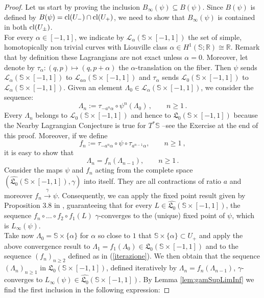 \documentclass{article}
\newcommand{\1}{\mathbbm{1}}
\theoremstyle{remark}
\begin{document}
\begin{proof}
Let us start by proving the inclusion $B_{\infty}(\psi) \subseteq B(\psi)$. Since $B(\psi)$ is defined by $B(\psi) = \textnormal{cl}(U_-) \cap \textnormal{cl}(U_+)$, we need to show that $B_{\infty}(\psi)$ is contained in both $\textnormal{cl}(U_\pm)$. \\
For every $\alpha \in [-1,1]$, we indicate by $\mathcal{L}_\alpha(\mathbb{S} \times [-1,1])$ the set of simple, homotopically non trivial curves with Liouville class $\alpha \in H^1(\mathbb{S};\mathbb{R}) \cong \mathbb{R}$. Remark that by definition these Lagrangians are not exact unless $\alpha=0$. Moreover, let denote by $\tau_{\alpha}:(q,p) \mapsto (q,p+\alpha)$ the $\alpha$-translation on the fiber. Then $\psi$ sends $\mathcal{L}_\alpha(\mathbb{S} \times [-1,1])$ to $\mathcal{L}_{a\alpha}(\mathbb{S} \times [-1,1])$ and $\tau_{\alpha}$ sends $\mathcal{L}_0(\mathbb{S} \times [-1,1])$ to $\mathcal{L}_{\alpha}(\mathbb{S} \times [-1,1])$. 
Given an element $\Lambda_0 \in \mathcal{L}_{\alpha}(\mathbb{S} \times [-1,1])$, we consider the sequence:
$$\Lambda_n := \tau_{-a^n\alpha} \circ \psi^n(\Lambda_0)\, , \qquad n \ge 1\, .$$
Every $\Lambda_n $ belongs to $\mathcal{L}_0(\mathbb{S} \times [-1,1])$ and hence to $\mathfrak{L}_0(\mathbb{S} \times [-1,1])$ because the Nearby Lagrangian Conjecture is true for $T^*\mathbb{S}$ --see the Exercise at the end of this proof. Moreover, if we define 
\begin{equation} \label{iterazione}
f_n := \tau_{-a^n\alpha} \circ \psi \circ \tau_{a^{n-1} \alpha}, \qquad n \ge 1\ ,
\end{equation}
it is easy to show that
$$
\Lambda_n = f_n(\Lambda_{n-1}), \qquad n \ge 1\, .
$$
Consider the maps $\psi$ and $f_n$ acting from the complete space $(\widehat{\mathfrak{L}_0}(\mathbb{S} \times [-1,1]),\gamma)$ into itself. They are all contractions of ratio $a$ and moreover $f_n \stackrel{\gamma}{\to} \psi$. Consequently, we can apply the fixed point result given by Proposition 3.8 in \cite{arnHumVit24}, guaranteeing that for every $L \in \widehat{\mathfrak{L}_0}(\mathbb{S} \times [-1,1])$, the sequence $f_n \circ \ldots \circ f_2 \circ f_1 (L)$ $\gamma$-converges to the (unique) fixed point of $\psi$, which is $L_{\infty}(\psi)$. \\
Take now $\Lambda_0 = \mathbb{S} \times \{\alpha\}$ for $\alpha$ so close to $1$ that $\mathbb{S} \times \{\alpha\} \subset U_+$ and apply the above convergence result to $\Lambda_1 = f_1(\Lambda_0) \in \mathfrak{L}_0(\mathbb{S} \times [-1,1])$ and to the sequence $(f_n)_{n \ge 2}$ defined as in (\ref{iterazione}). We then obtain that the sequence $(\Lambda_n)_{n \ge 1}$ in $\mathfrak{L}_0(\mathbb{S} \times [-1,1])$, defined iteratively by $\Lambda_n = f_n(\Lambda_{n-1})$, $\gamma$-converges to $L_{\infty}(\psi) \in \widehat{\mathfrak{L}_0}(\mathbb{S} \times [-1,1])$. By Lemma \ref{lem:gamSupLimInf} we find the first inclusion in the following expression:

\end{proof}
\end{document}
